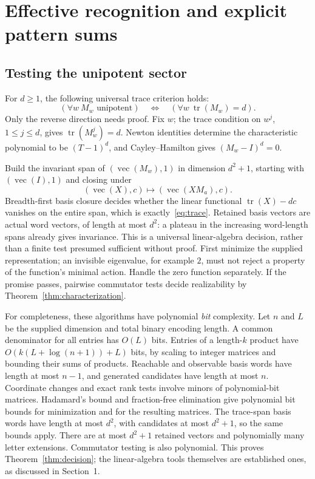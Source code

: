 \documentclass[acmlarge,screen,11pt,nonacm]{acmart}
\theoremstyle{definition}
\newcommand{\tr}{\operatorname{tr}}
\newcommand{\vecop}{\operatorname{vec}}
\begin{document}
\section{Effective recognition and explicit pattern sums}\label{sec:algorithms}
\subsection{Testing the unipotent sector}
For $d\geq1$, the following universal trace criterion holds:
\begin{equation}\label{eq:trace}
 (\forall w\ M_w\text{ unipotent})
 \quad\Longleftrightarrow\quad
 (\forall w\ \tr(M_w)=d).
\end{equation}
Only the reverse direction needs proof. Fix $w$; the trace condition on $w^j$, $1\leq j\leq d$, gives $\tr(M_w^j)=d$. Newton identities determine the characteristic polynomial to be $(T-1)^d$, and Cayley--Hamilton gives $(M_w-I)^d=0$.

Build the invariant span of $(\vecop(M_w),1)$ in dimension $d^2+1$, starting with $(\vecop(I),1)$ and closing under
\[
 (\vecop(X),c)\longmapsto(\vecop(XM_a),c).
\]
Breadth-first basis closure decides whether the linear functional $\tr(X)-dc$ vanishes on the entire span, which is exactly~\eqref{eq:trace}. Retained basis vectors are actual word vectors, of length at most $d^2$: a plateau in the increasing word-length spans already gives invariance. This is a universal linear-algebra decision, rather than a finite test presumed sufficient without proof. First minimize the supplied representation; an invisible eigenvalue, for example $2$, must not reject a property of the function's minimal action. Handle the zero function separately. If the promise passes, pairwise commutator tests decide realizability by Theorem~\ref{thm:characterization}.

For completeness, these algorithms have polynomial \emph{bit} complexity. Let $n$ and $L$ be the supplied dimension and total binary encoding length. A common denominator for all entries has $O(L)$ bits. Entries of a length-$k$ product have $O(k(L+\log(n+1))+L)$ bits, by scaling to integer matrices and bounding their sums of products. Reachable and observable basis words have length at most $n-1$, and generated candidates have length at most $n$. Coordinate changes and exact rank tests involve minors of polynomial-bit matrices. Hadamard's bound and fraction-free elimination give polynomial bit bounds for minimization and for the resulting matrices. The trace-span basis words have length at most $d^2$, with candidates at most $d^2+1$, so the same bounds apply. There are at most $d^2+1$ retained vectors and polynomially many letter extensions. Commutator testing is also polynomial. This proves Theorem~\ref{thm:decision}; the linear-algebra tools themselves are established ones, as discussed in Section~1.
\end{document}
